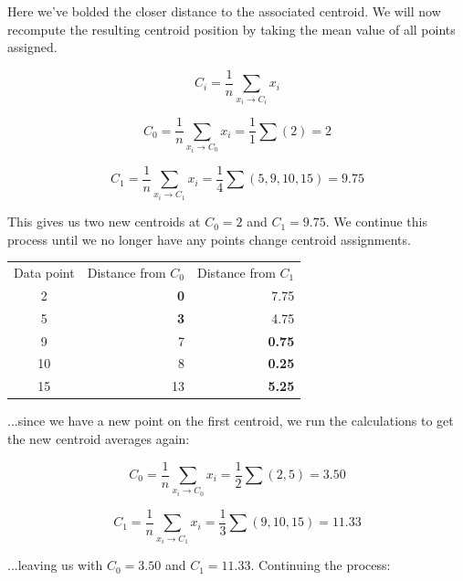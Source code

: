 \documentclass{article}
\begin{document}
\noindent Here we've bolded the closer distance to the associated centroid. We will now recompute the resulting centroid position by taking the mean value of all points assigned.

\begin{equation}
    C_i = \frac{1}{n} \sum_{x_i \rightarrow C_i} x_i
\end{equation}

\begin{equation}
    C_0 = \frac{1}{n} \sum_{x_i \rightarrow C_0} x_i = \frac{1}{1} \sum (2) = 2
\end{equation}

\begin{equation}
    C_1 = \frac{1}{n} \sum_{x_i \rightarrow C_1} x_i = \frac{1}{4} \sum (5,9,10,15) = 9.75
\end{equation}

\noindent This gives us two new centroids at $C_0=2$ and $C_1=9.75$. We continue this process until we no longer have any points change centroid assignments.

\begin{center}
    \begin{tabular}{c r r}
        Data point & Distance from $C_0$ & Distance from $C_1$\\
        2 & \textbf{0} & 7.75 \\
        5 & \textbf{3} & 4.75 \\
        9 & 7 & \textbf{0.75} \\
        10 & 8 & \textbf{0.25} \\
        15 & 13 & \textbf{5.25} \\
    \end{tabular}
\end{center}

\noindent ...since we have a new point on the first centroid, we run the calculations to get the new centroid averages again:

\begin{equation}
    C_0 = \frac{1}{n} \sum_{x_i \rightarrow C_0} x_i = \frac{1}{2} \sum (2,5) = 3.50
\end{equation}

\begin{equation}
    C_1 = \frac{1}{n} \sum_{x_i \rightarrow C_1} x_i = \frac{1}{3} \sum (9,10,15) = 11.33
\end{equation}

\noindent ...leaving us with $C_0=3.50$ and $C_1=11.33$. Continuing the process:
\end{document}
